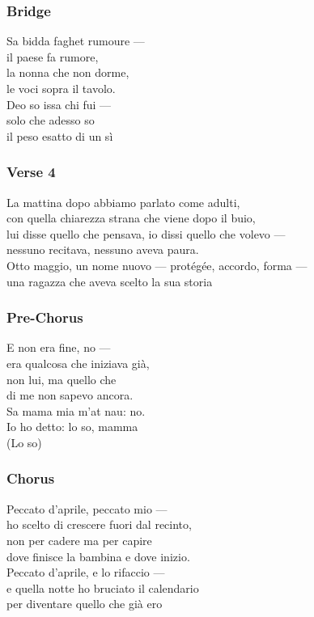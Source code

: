 \subsubsection{Bridge}\label{bridge-5}

Sa bidda faghet rumoure ---\\
il paese fa rumore,\\
la nonna che non dorme,\\
le voci sopra il tavolo.\\
Deo so issa chi fui ---\\
solo che adesso so\\
il peso esatto di un sì

\subsubsection{Verse 4}\label{verse-4-1}

La mattina dopo abbiamo parlato come adulti,\\
con quella chiarezza strana che viene dopo il buio,\\
lui disse quello che pensava, io dissi quello che volevo ---\\
nessuno recitava, nessuno aveva paura.\\
Otto maggio, un nome nuovo --- protégée, accordo, forma ---\\
una ragazza che aveva scelto la sua storia

\subsubsection{Pre-Chorus}\label{pre-chorus-10}

E non era fine, no ---\\
era qualcosa che iniziava già,\\
non lui, ma quello che\\
di me non sapevo ancora.\\
Sa mama mia m'at nau: no.\\
Io ho detto: lo so, mamma\\
(Lo so)

\subsubsection{Chorus}\label{chorus-19}

Peccato d'aprile, peccato mio ---\\
ho scelto di crescere fuori dal recinto,\\
non per cadere ma per capire\\
dove finisce la bambina e dove inizio.\\
Peccato d'aprile, e lo rifaccio ---\\
e quella notte ho bruciato il calendario\\
per diventare quello che già ero

